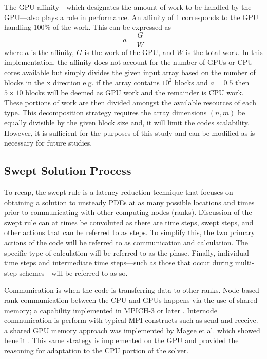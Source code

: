 \documentclass[review]{elsarticle}
\begin{document}
\par
The GPU affinity---which designates the amount of work to be handled by the GPU---also plays a role in performance. An affinity of 1 corresponds to the GPU handling 100\% of the work. This can be expressed as
\begin{equation}
    a = \frac{G}{W}
\end{equation}
where $a$ is the affinity, $G$ is the work of the GPU, and $W$ is the total work. In this implementation, the affinity does not account for the number of GPUs or CPU cores available but simply divides the given input array based on the number of blocks in the x direction e.g. if the array contains $10^2$ blocks and $a=0.5$ then $5\times10$ blocks will be deemed as GPU work and the remainder is CPU work. These portions of work are then divided amongst the available resources of each type. This decomposition strategy requires the array dimensions $(n, m)$ be equally divisible by the given block size and, it will limit the codes scalability. However, it is sufficient for the purposes of this study and can be modified as is necessary for future studies. 

\subsection{Swept Solution Process}
\par
To recap, the swept rule is a latency reduction technique that focuses on obtaining a solution to unsteady PDEs at as many possible locations and times prior to communicating with other computing nodes (ranks). Discussion of the swept rule can at times be convoluted as there are time steps, swept steps, and other actions that can be referred to as steps. To simplify this, the two primary actions of the code will be referred to as communication and calculation. The specific type of calculation will be referred to as the phase. Finally, individual time steps and intermediate time steps---such as those that occur during multi-step schemes---will be referred to as so. 

\par
 Communication is when the code is transferring data to other ranks. Node based rank communication between the CPU and GPUs happens via the use of shared memory; a capability implemented in MPICH-3 or later \cite{Hoefler2013MPIMemory}. Internode communication is perform with typical MPI constructs such as send and receive. a shared GPU memory approach was implemented by Magee et al. which showed benefit \cite{Magee2018AcceleratingDecomposition}. This same strategy is implemented on the GPU and provided the reasoning for adaptation to the CPU portion of the solver. 
 
\end{document}
